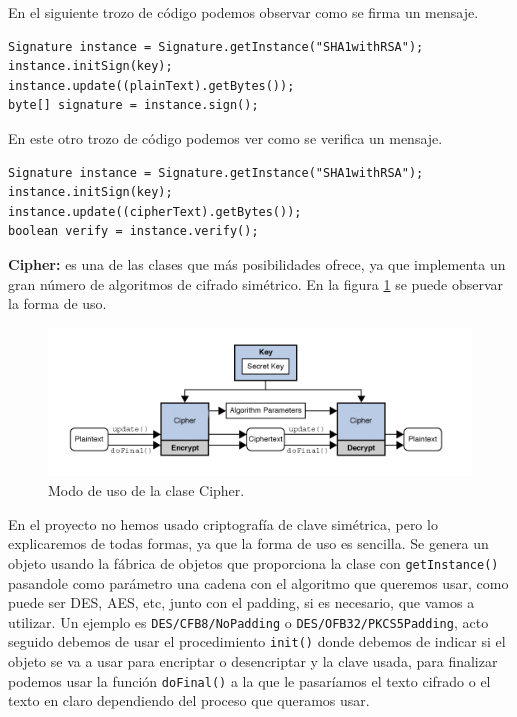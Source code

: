 En el siguiente trozo de código podemos observar como se firma un mensaje. 

\begin{lstlisting}[style=Java] 
Signature instance = Signature.getInstance("SHA1withRSA");
instance.initSign(key);
instance.update((plainText).getBytes());
byte[] signature = instance.sign();
\end{lstlisting}

En este otro trozo de código podemos ver como se verifica un mensaje. 

\begin{lstlisting}[style=Java] 
Signature instance = Signature.getInstance("SHA1withRSA");
instance.initSign(key);
instance.update((cipherText).getBytes());
boolean verify = instance.verify();
\end{lstlisting}

\textbf{Cipher:} es una de las clases que más posibilidades ofrece, ya que implementa un gran número de algoritmos de cifrado simétrico. En la figura \ref{fig:cipher} se puede observar la forma de uso. 

\begin{figure}[h]
  \centering
    \includegraphics[scale=0.8]{./Criptografia/imagenes/cipher.png}
  \caption{Modo de uso de la clase Cipher.}
  \label{fig:cipher}
\end{figure} 

En el proyecto no hemos usado criptografía de clave simétrica, pero lo explicaremos de todas formas, ya que la forma de uso es sencilla. Se genera un objeto usando la fábrica de objetos que proporciona la clase con \lstinline{getInstance()} pasandole como parámetro una cadena con el algoritmo que queremos usar, como puede ser DES, AES, etc, junto con el padding, si es necesario, que vamos a utilizar. Un ejemplo es \lstinline{DES/CFB8/NoPadding} o \lstinline{DES/OFB32/PKCS5Padding}, acto seguido debemos de usar el procedimiento \lstinline{init()} donde debemos de indicar si el objeto se va a usar para encriptar o desencriptar y la clave usada, para finalizar podemos usar la función \lstinline{doFinal()} a la que le pasaríamos el texto cifrado o el texto en claro dependiendo del proceso que queramos usar.

